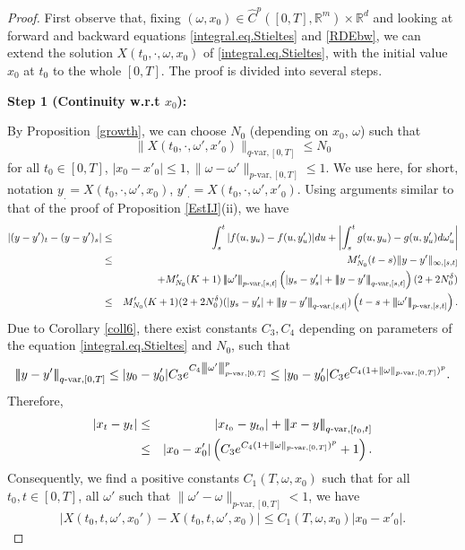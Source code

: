 \documentclass[10pt]{article}
\numberwithin{equation}{section} %
\newcommand{\R}{\ensuremath{\mathbb{R}}}
\newcommand{\ltn}{\ensuremath{\left| \! \left| \! \left|}}
\newcommand{\rtn}{\ensuremath{\right| \! \right| \! \right|}}
\begin{document}
\begin{proof}
 First observe that, fixing $(\omega,x_0) \in \widehat{C}^{p}([0,T],\R^m)\times \R^d $ and looking at forward and backward equations \eqref{integral.eq.Stieltes} and \eqref{RDEbw}, we can extend the solution $X(t_0,\cdot,\omega,x_0)$ of \eqref{integral.eq.Stieltes}, with the initial value $x_0$ at $t_0$ to the whole $[0,T]$.
 The proof is divided into several steps. \medskip

 {\bf {Step 1 (Continuity w.r.t $x_0$)}:}\medskip
 
 By Proposition~\ref{growth}, we can choose $N_0$ (depending on $x_0$, $\omega$) such that
 $$
 \|X(t_0,\cdot,\omega',x'_0)\|_{q\text{-var},[0,T]}\leq N_0
 $$
for all $t_0\in [0,T]$, $|x_0-x'_0|\leq 1, \|\omega-\omega'\|_{p\text{-var},[0,T]}\leq 1$.
We use here, for short, notation
 $y_. = X(t_0,\cdot,\omega',x_0)$, $y'_. = X(t_0,\cdot,\omega',x'_0)$.
Using arguments similar to that of the proof of Proposition \ref{EstIJ}(ii), we have
\begin{eqnarray*}
|(y-y')_t-(y-y')_s|&\leq & \int_s^t|f(u,y_u)-f(u,y'_u)|du+ \left|\int_s^t g(u,y_u)-g(u,y'_u)d\omega'_u\right|\\
				&\leq & M_{N_0}^\prime (t-s)\|y-y'\|_{\infty,[s,t]} \\
				&&+  M_{N_0}^\prime(K+1)\ltn \omega'\rtn_{p\text{-var},[s,t]}\left( |y_s-y'_s| + \ltn y-y'\rtn_{q\text{-var},[s,t]}\right)(2+2N_0^\delta)\\
				&\leq &  M_{N_0}^\prime(K+1)(2+2N_0^\delta) ( |y_s-y'_s| + \ltn y-y'\rtn_{q\text{-var},[s,t]}) \left( t-s+ \ltn \omega'\rtn_{p\text{-var},[s,t]}\right).
\end{eqnarray*} 
Due to Corollary \ref{coll6}, there exist constants $C_3,C_4$ depending on parameters of the equation \eqref{integral.eq.Stieltes} and $N_0$, such that
$$
\ltn y-y'\rtn_{q\text{-var},[0,T]}\leq |y_0-y'_0| C_3 e^{C_4\ltn \omega'\rtn_{p\text{-var},[0,T]}^p}\leq |y_0-y'_0| C_3 e^{C_4(1+\| \omega\|_{p\text{-var},[0,T]})^p}.
$$
Therefore, 
\begin{eqnarray*}
|x_t-y_t| &\leq &|x_{t_0}-y_{t_0}| +\ltn x-y\rtn_{q\text{-var},[t_0,t]}\\
&\leq & |x_0-x'_0| \left(C_3 e^{C_4(1+\| \omega\|_{p\text{-var},[0,T]})^p} +1\right).
\end{eqnarray*} 
Consequently, we find a positive constants $C_1(T,\omega,x_0)$ such that  for all $t_0,t\in [0,T]$, all $\omega'$ such that $\|\omega'-\omega\|_{p\text{-var},[0,T]}<1$, we have
\begin{eqnarray}\label{cont1}
|X(t_0,t,\omega',x_0')-X(t_0,t,\omega',x_0)|\leq C_1(T,\omega,x_0)|x_0-x'_0|.
\end{eqnarray}


\end{proof}
\end{document}
